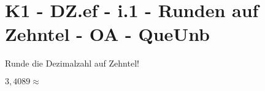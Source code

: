 \section{K1 - DZ.ef - i.1 - Runden auf Zehntel - OA - QueUnb}

\begin{beispiel}{0} %
				Runde die Dezimalzahl auf Zehntel!\leer
					
					$3,4089\approx$ 
\end{beispiel}